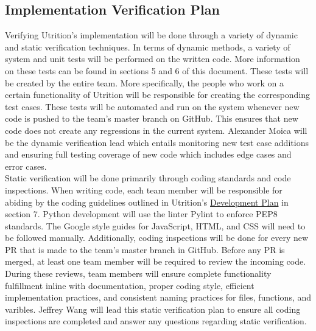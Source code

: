\documentclass[12pt, titlepage]{article}
\begin{document}
	\subsection{Implementation Verification Plan}
	
	
	
	Verifying Utrition's implementation will be done through a variety of dynamic and static verification techniques. In terms of dynamic methods, a variety of system and unit tests will be performed on the written code. More information on these tests can be found in sections 5 and 6 of this document. These tests will be created by the entire team. More specifically, the people who work on a certain functionality of Utrition will be responsible for creating the corresponding test cases. These tests will be automated and run on the system whenever new code is pushed to the team's master branch on GitHub. This ensures that new code does not create any regressions in the current system. Alexander Moica will be the dynamic verification lead which entails monitoring new test case additions and ensuring full testing coverage of new code which includes edge cases and error cases.\\
	
	Static verification will be done primarily through coding standards and code inspections. When writing code, each team member will be responsible for abiding by the coding guidelines outlined in Utrition's \href{https://github.com/jeff-rey-wang/utrition/blob/dff32f8ddc662d07db9bd74e0b3705aa657dae6e/docs/DevelopmentPlan/DevelopmentPlan.pdf}{Development Plan} in section 7. Python development will use the linter Pylint to enforce PEP8 standards. The Google style guides for JavaScript, HTML, and CSS will need to be followed manually. Additionally, coding inspections will be done for every new PR that is made to the team's master branch in GitHub. Before any PR is merged, at least one team member will be required to review the incoming code. During these reviews, team members will ensure complete functionality fulfillment inline with documentation, proper coding style, efficient implementation practices, and consistent naming practices for files, functions, and varibles. Jeffrey Wang will lead this static verification plan to ensure all coding inspections are completed and answer any questions regarding static verification.
	
\end{document}
